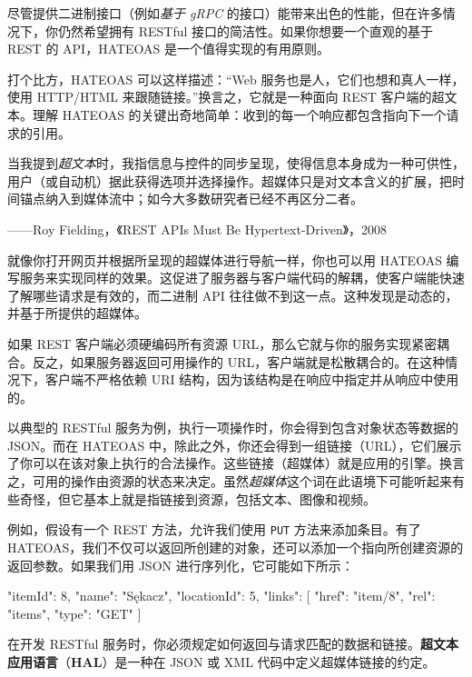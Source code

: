 \label{idx:1636}
尽管提供二进制接口（例如\emph{基于 gRPC} 的接口）能带来出色的性能，但在许多情况下，你仍然希望拥有 RESTful 接口的简洁性。如果你想要一个直观的基于 REST 的 API，HATEOAS 是一个值得实现的有用原则。

打个比方，HATEOAS 可以这样描述：“Web 服务也是人，它们也想和真人一样，使用 HTTP/HTML 来跟随链接。”换言之，它就是一种面向 REST 客户端的超文本。理解 HATEOAS 的关键出奇地简单：收到的每一个响应都包含指向下一个请求的引用。

\begin{myQuote}
当我提到\emph{超文本}时，我指信息与控件的同步呈现，使得信息本身成为一种可供性，用户（或自动机）据此获得选项并选择操作。超媒体只是对文本含义的扩展，把时间锚点纳入到媒体流中；如今大多数研究者已经不再区分二者。

——Roy Fielding，《REST APIs Must Be Hypertext-Driven》，2008

\end{myQuote}

就像你打开网页并根据所呈现的超媒体进行导航一样，你也可以用 HATEOAS 编写服务来实现同样的效果。这促进了服务器与客户端代码的解耦，使客户端能快速了解哪些请求是有效的，而二进制 API 往往做不到这一点。这种发现是动态的，并基于所提供的超媒体。

如果 REST 客户端必须硬编码所有资源 URL，那么它就与你的服务实现紧密耦合。反之，如果服务器返回可用操作的 URL，客户端就是松散耦合的。在这种情况下，客户端不严格依赖 URI 结构，因为该结构是在响应中指定并从响应中使用的。

\label{idx:1637}
以典型的 RESTful 服务为例，执行一项操作时，你会得到包含对象状态等数据的 JSON。而在 HATEOAS 中，除此之外，你还会得到一组链接（URL），它们展示了你可以在该对象上执行的合法操作。这些链接（超媒体）就是应用的引擎。换言之，可用的操作由资源的状态来决定。虽然\emph{超媒体}这个词在此语境下可能听起来有些奇怪，但它基本上就是指链接到资源，包括文本、图像和视频。

例如，假设有一个 REST 方法，允许我们使用 \texttt{PUT} 方法来添加条目。有了 HATEOAS，我们不仅可以返回所创建的对象，还可以添加一个指向所创建资源的返回参数。如果我们用 JSON 进行序列化，它可能如下所示：

\begin{codebox}[json]
{
    "itemId": 8,
    "name": "Sękacz",
    "locationId": 5,
    "links": [
        {
            "href": "item/8",
            "rel": "items",
            "type": "GET"
        }
    ]
}
\end{codebox}

\label{idx:1638}
在开发 RESTful 服务时，你必须规定如何返回与请求匹配的数据和链接。\textbf{超文本应用语言}（\textbf{HAL}）是一种在 JSON 或 XML 代码中定义超媒体链接的约定。


